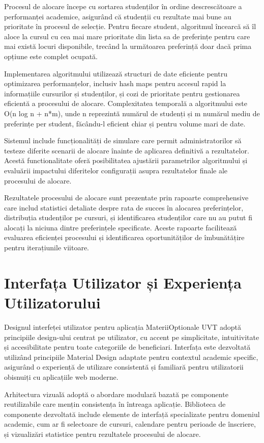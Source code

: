 \documentclass[12pt,a4paper]{report}
\begin{document}
Procesul de alocare începe cu sortarea studenților în ordine descrescătoare a performanței academice, asigurând că studenții cu rezultate mai bune au prioritate în procesul de selecție. Pentru fiecare student, algoritmul încearcă să îl aloce la cursul cu cea mai mare prioritate din lista sa de preferințe pentru care mai există locuri disponibile, trecând la următoarea preferință doar dacă prima opțiune este complet ocupată.

Implementarea algoritmului utilizează structuri de date eficiente pentru optimizarea performanțelor, inclusiv hash maps pentru accesul rapid la informațiile cursurilor și studenților, și cozi de prioritate pentru gestionarea eficientă a procesului de alocare. Complexitatea temporală a algoritmului este O(n log n + n*m), unde n reprezintă numărul de studenți și m numărul mediu de preferințe per student, făcându-l eficient chiar și pentru volume mari de date.

Sistemul include funcționalități de simulare care permit administratorilor să testeze diferite scenarii de alocare înainte de aplicarea definitivă a rezultatelor. Acestă functionalitate oferă posibilitatea ajustării parametrilor algoritmului și evaluării impactului diferitelor configurații asupra rezultatelor finale ale procesului de alocare.

Rezultatele procesului de alocare sunt prezentate prin rapoarte comprehensive care includ statistici detaliate despre rata de succes în alocarea preferințelor, distribuția studenților pe cursuri, și identificarea studenților care nu au putut fi alocați la niciuna dintre preferințele specificate. Aceste rapoarte facilitează evaluarea eficienței procesului și identificarea oportunităților de îmbunătățire pentru iterațiunile viitoare.

\section{Interfața Utilizator și Experiența Utilizatorului}

Designul interfeței utilizator pentru aplicația MateriiOptionale UVT adoptă principiile design-ului centrat pe utilizator, cu accent pe simplicitate, intuitivitate și accesibilitate pentru toate categoriile de beneficiari. Interfața este dezvoltată utilizând principiile Material Design adaptate pentru contextul academic specific, asigurând o experiență de utilizare consistentă și familiară pentru utilizatorii obisnuiți cu aplicațiile web moderne.

Arhitectura vizuală adoptă o abordare modulară bazată pe componente reutilizabile care mențin consistența în întreaga aplicație. Biblioteca de componente dezvoltată include elemente de interfață specializate pentru domeniul academic, cum ar fi selectoare de cursuri, calendare pentru perioade de înscriere, și vizualizări statistice pentru rezultatele procesului de alocare.
\end{document}
